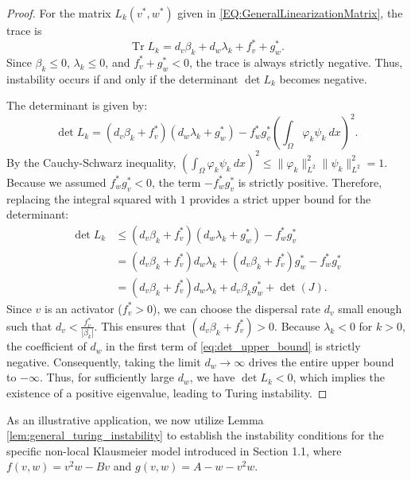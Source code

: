 \documentclass[11pt, a4paper]{article}
\theoremstyle{break}
\theoremstyle{break}
\theoremstyle{break}
\theoremstyle{break}
\theoremstyle{break}
\theoremstyle{break}
\theoremstyle{break}
\theoremstyle{break}
\theoremstyle{break}
\theoremstyle{break}
\DeclareMathOperator{\Tr}{Tr}
\begin{document}
\begin{proof}
    For the matrix $L_k(v^*, w^*)$ given in \eqref{EQ:GeneralLinearizationMatrix}, the trace is 
    \begin{equation}
        \Tr L_k = d_v \beta_k + d_w \lambda_k + f_v^* + g_w^*.
    \end{equation}
    Since $\beta_k \le 0$, $\lambda_k \le 0$, and $f_v^* + g_w^* < 0$, the trace is always strictly negative. Thus, instability occurs if and only if the determinant $\det L_k$ becomes negative. 
    
    The determinant is given by:
    \begin{equation}
        \det L_k = (d_v \beta_k + f_v^*)(d_w \lambda_k + g_w^*) - f_w^* g_v^* \left(\int_\Omega \varphi_k \psi_k \:dx\right)^2.
    \end{equation}
    By the Cauchy-Schwarz inequality, $\left(\int_\Omega \varphi_k \psi_k \:dx\right)^2 \leq \|\varphi_k\|_{L^2}^2 \|\psi_k\|_{L^2}^2 = 1$. Because we assumed $f_w^* g_v^* < 0$, the term $-f_w^* g_v^*$ is strictly positive. Therefore, replacing the integral squared with $1$ provides a strict upper bound for the determinant:
    \begin{align}
        \det L_k &\leq (d_v \beta_k + f_v^*)(d_w \lambda_k + g_w^*) - f_w^* g_v^* \nonumber \\
        &= (d_v \beta_k + f_v^*) d_w \lambda_k + (d_v \beta_k + f_v^*) g_w^* - f_w^* g_v^* \nonumber \\
        &= (d_v \beta_k + f_v^*) d_w \lambda_k + d_v \beta_k g_w^* + \det(J). \label{eq:det_upper_bound}
    \end{align}
    Since $v$ is an activator ($f_v^* > 0$), we can choose the dispersal rate $d_v$ small enough such that $d_v < \frac{f_v^*}{|\beta_k|}$. This ensures that $(d_v \beta_k + f_v^*) > 0$. Because $\lambda_k < 0$ for $k > 0$, the coefficient of $d_w$ in the first term of \eqref{eq:det_upper_bound} is strictly negative. Consequently, taking the limit $d_w \to \infty$ drives the entire upper bound to $-\infty$. Thus, for sufficiently large $d_w$, we have $\det L_k < 0$, which implies the existence of a positive eigenvalue, leading to Turing instability.
\end{proof}

As an illustrative application, we now utilize Lemma \ref{lem:general_turing_instability} to establish the instability conditions for the specific non-local Klausmeier model introduced in Section 1.1, where $f(v,w) = v^2 w - Bv$ and $g(v,w) = A - w - v^2 w$.
\end{document}
